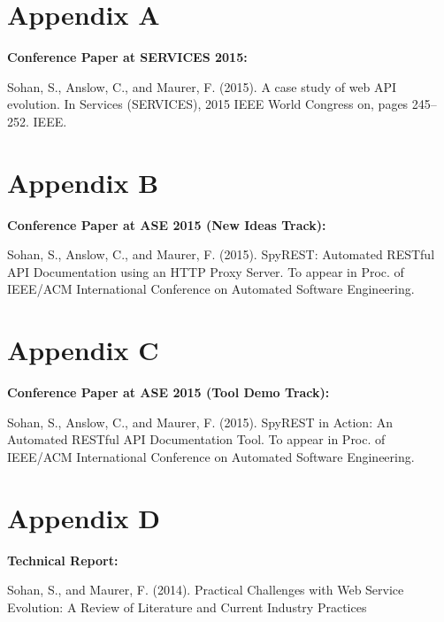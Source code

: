 \documentclass[11pt,oneside]{book}
\begin{document}
\begin{appendices}

\chapter{Appendix A}

\textbf{Conference Paper at SERVICES 2015:}

Sohan, S., Anslow, C., and Maurer, F. (2015). A case study of web API evolution. In Services (SERVICES), 2015 IEEE World Congress on, pages 245–252. IEEE.

\chapter{Appendix B}

\textbf{Conference Paper at ASE 2015 (New Ideas Track):}

Sohan, S., Anslow, C., and Maurer, F. (2015). SpyREST: Automated RESTful API Documentation using an HTTP Proxy Server. To appear in Proc. of IEEE/ACM International Conference on Automated Software Engineering.

\chapter{Appendix C}

\textbf{Conference Paper at ASE 2015 (Tool Demo Track):}

Sohan, S., Anslow, C., and Maurer, F. (2015). SpyREST in Action: An Automated RESTful API Documentation Tool. To appear in Proc. of IEEE/ACM International Conference on Automated Software Engineering.

\chapter{Appendix D}

\textbf{Technical Report:}

Sohan, S., and Maurer, F. (2014). Practical Challenges with Web Service Evolution: A Review of Literature and Current Industry Practices
\end{appendices}
\end{document}

